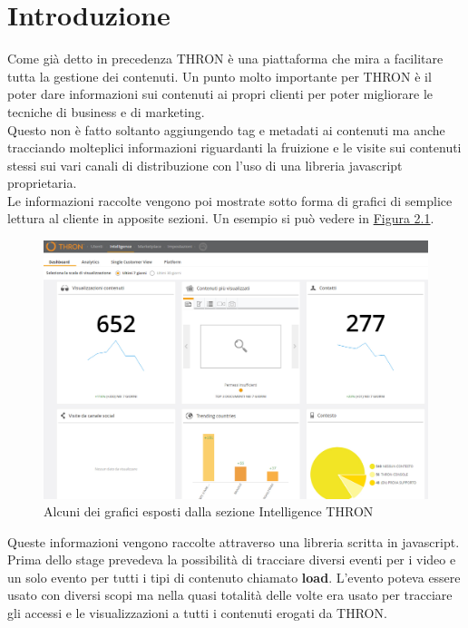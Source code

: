 \documentclass[a4paper, 12pt, twoside, openright]{book}
\begin{document}
\section{Introduzione}
Come già detto in precedenza THRON è una piattaforma che mira a facilitare tutta la gestione dei contenuti. Un punto molto importante per THRON è il poter dare informazioni sui contenuti ai propri clienti per poter migliorare le tecniche di business e di marketing.\\
Questo non è fatto soltanto aggiungendo tag e metadati ai contenuti ma anche tracciando molteplici informazioni riguardanti la fruizione e le visite sui contenuti stessi sui vari canali di distribuzione con l'uso di una libreria javascript proprietaria.\\
Le informazioni raccolte vengono poi mostrate sotto forma di grafici di semplice lettura al cliente in apposite sezioni. Un esempio si può vedere in \hyperref[reports-example]{Figura 2.1}.\\
\begin{figure}[h] %
	\centering
	\label{reports-example}
	\includegraphics[width=1.0\textwidth]{images/reports-example.jpg}
	\caption{Alcuni dei grafici esposti dalla sezione Intelligence THRON}
\end{figure} 
Queste informazioni vengono raccolte attraverso una libreria scritta in javascript. Prima dello stage prevedeva la possibilità di tracciare diversi eventi per i video e un solo evento per tutti i tipi di contenuto chiamato \textbf{load}. L'evento poteva essere usato con diversi scopi ma nella quasi totalità delle volte era usato per tracciare gli accessi e le visualizzazioni a tutti i contenuti erogati da THRON.\\
\end{document}
